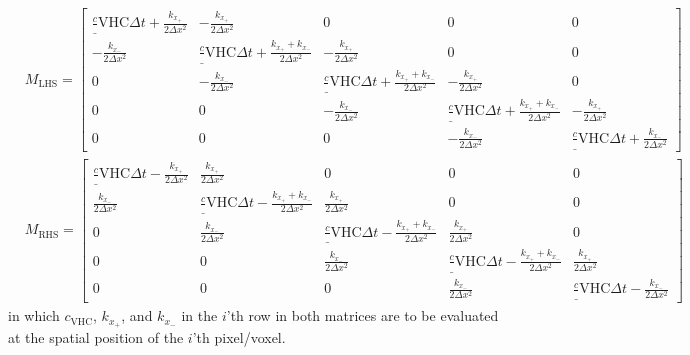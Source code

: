 \documentclass{scrartcl}
\newcommand{\VHC}{c_\mathrm{VHC}}
\begin{document}
\begin{align}
&M_\mathrm{LHS} = \begin{bmatrix}
\frac \VHC {\Delta t} + \frac{k_{x_+}}{2\Delta x^2} & - \frac{k_{x_+}}{2\Delta x^2} & 0 & 0 & 0\\
- \frac{k_{x_-}}{2\Delta x^2} & \frac \VHC {\Delta t} + \frac{k_{x_+}+k_{x_-}}{2\Delta x^2} & - \frac{k_{x_+}}{2\Delta x^2} & 0 & 0\\
0 & - \frac{k_{x_-}}{2\Delta x^2} & \frac \VHC {\Delta t} + \frac{k_{x_+}+k_{x_-}}{2\Delta x^2} & - \frac{k_{x_+}}{2\Delta x^2} & 0\\
0 & 0 & - \frac{k_{x_-}}{2\Delta x^2} & \frac \VHC {\Delta t} + \frac{k_{x_+}+k_{x_-}}{2\Delta x^2} & - \frac{k_{x_+}}{2\Delta x^2}\\
0 & 0 & 0 & - \frac{k_{x_-}}{2\Delta x^2} & \frac \VHC {\Delta t} + \frac{k_{x_-}}{2\Delta x^2}
\end{bmatrix}\\
&M_\mathrm{RHS} = \begin{bmatrix}
\frac \VHC {\Delta t} - \frac{k_{x_+}}{2\Delta x^2} & \frac{k_{x_+}}{2\Delta x^2} & 0 & 0 & 0\\
\frac{k_{x_-}}{2\Delta x^2} & \frac \VHC {\Delta t} - \frac{k_{x_+}+k_{x_-}}{2\Delta x^2} & \frac{k_{x_+}}{2\Delta x^2} & 0 & 0\\
0 & \frac{k_{x_-}}{2\Delta x^2} & \frac \VHC {\Delta t} - \frac{k_{x_+}+k_{x_-}}{2\Delta x^2} & \frac{k_{x_+}}{2\Delta x^2} & 0\\
0 & 0 & \frac{k_{x_-}}{2\Delta x^2} & \frac \VHC {\Delta t} - \frac{k_{x_+}+k_{x_-}}{2\Delta x^2} & \frac{k_{x_+}}{2\Delta x^2}\\
0 & 0 & 0 & \frac{k_{x_-}}{2\Delta x^2} & \frac \VHC {\Delta t} - \frac{k_{x_-}}{2\Delta x^2}
\end{bmatrix}
\end{align}
in which $\VHC$, $k_{x_+}$, and $k_{x_-}$ in the $i$'th row in both matrices are to be evaluated at the spatial position of the $i$'th pixel/voxel.
\end{document}
